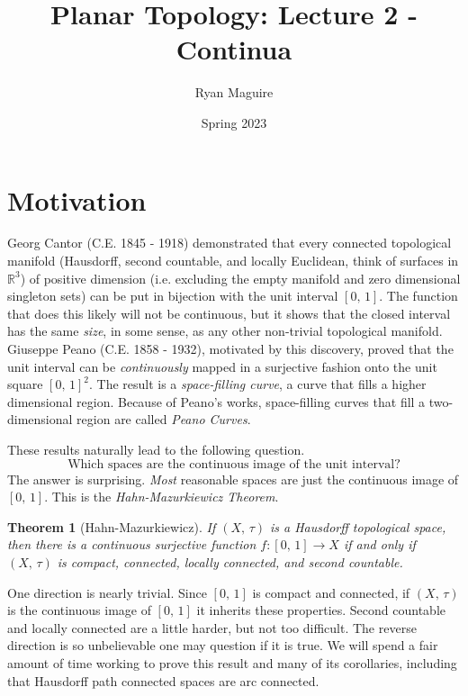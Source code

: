 \documentclass{article}
\title{Planar Topology: Lecture 2 - Continua}
\author{Ryan Maguire}
\date{Spring 2023}
\theoremstyle{plain}
\newtheorem{theorem}{Theorem}[section]
\theoremstyle{normal}
\begin{document}
    \maketitle
    \tableofcontents
    \listoffigures
    \section{Motivation}
        Georg Cantor (C.E. 1845 - 1918)
        demonstrated that every connected topological
        manifold (Hausdorff, second countable, and locally Euclidean, think of
        surfaces in $\mathbb{R}^{3}$) of positive dimension (i.e. excluding
        the empty manifold and zero dimensional singleton sets) can be put in
        bijection with the unit interval $[0,\,1]$. The function that does this
        likely will not be continuous, but it shows that the closed interval
        has the same \textit{size}, in some sense, as any other non-trivial
        topological manifold.
        Giuseppe Peano (C.E. 1858 - 1932), motivated by
        this discovery, proved that the unit interval can be
        \textit{continuously} mapped in a surjective fashion onto the unit
        square $[0,\,1]^{2}$. The result is a
        \textit{space-filling curve}, a curve
        that fills a higher dimensional region. Because of Peano's works,
        space-filling curves that fill a two-dimensional region are called
        \textit{Peano Curves}.
        \par\hfill\par
        These results naturally lead to the following question.
        \begin{equation}
            \textrm{Which spaces are the continuous image of the unit interval?}
        \end{equation}
        The answer is surprising. \textit{Most} reasonable spaces
        are just the continuous image of $[0,\,1]$. This is the
        \textit{Hahn-Mazurkiewicz Theorem}.
        \begin{theorem}[Hahn-Mazurkiewicz]
            If $(X,\,\tau)$ is a Hausdorff topological space, then there is a
            continuous surjective function $f:[0,\,1]\rightarrow{X}$ if and
            only if $(X,\,\tau)$ is compact, connected, locally connected, and
            second countable.
        \end{theorem}
        One direction is nearly trivial. Since $[0,\,1]$ is compact and
        connected, if $(X,\,\tau)$ is the continuous image of $[0,\,1]$ it
        inherits these properties. Second countable and locally connected are
        a little harder, but not too difficult. The
        reverse direction is so unbelievable one may question if it is true.
        We will spend a fair amount of time working to prove this result and
        many of its corollaries, including that Hausdorff path connected spaces
        are arc connected.
\end{document}
